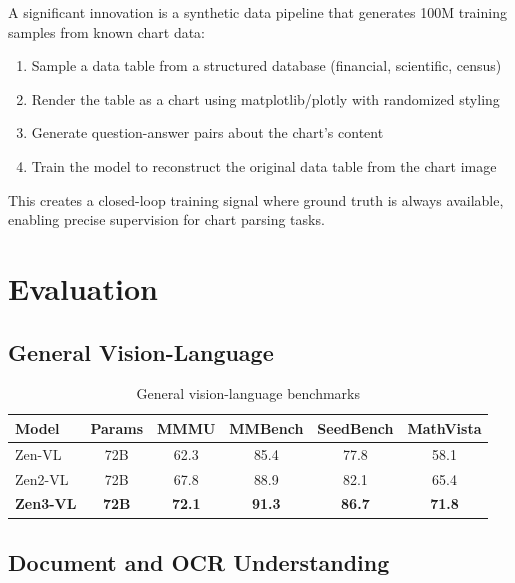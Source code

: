 \documentclass[11pt,a4paper]{article}
\begin{document}
A significant innovation is a synthetic data pipeline that generates 100M training
samples from known chart data:

\begin{enumerate}
\item Sample a data table from a structured database (financial, scientific, census)
\item Render the table as a chart using matplotlib/plotly with randomized styling
\item Generate question-answer pairs about the chart's content
\item Train the model to reconstruct the original data table from the chart image
\end{enumerate}

This creates a closed-loop training signal where ground truth is always available,
enabling precise supervision for chart parsing tasks.

\section{Evaluation}
\label{sec:eval}

\subsection{General Vision-Language}

\begin{table}[H]
\centering
\caption{General vision-language benchmarks}
\begin{tabular}{lccccc}
\toprule
\textbf{Model} & \textbf{Params} & \textbf{MMMU} & \textbf{MMBench} & \textbf{SeedBench} & \textbf{MathVista} \\
\midrule
Zen-VL      & 72B & 62.3 & 85.4 & 77.8 & 58.1 \\
Zen2-VL     & 72B & 67.8 & 88.9 & 82.1 & 65.4 \\
\textbf{Zen3-VL} & \textbf{72B} & \textbf{72.1} & \textbf{91.3} & \textbf{86.7} & \textbf{71.8} \\
\bottomrule
\end{tabular}
\label{tab:general_vl}
\end{table}

\subsection{Document and OCR Understanding}
\end{document}
